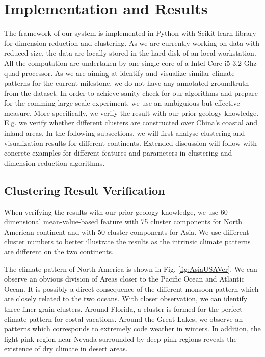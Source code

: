\section{Implementation and Results}
The framework of our system is implemented in Python with Scikit-learn library for dimension reduction and clustering.
As we are currently working on data with reduced size, the data are locally stored in the hard disk of an local workstation.
All the computation are undertaken by one single core of a Intel Core i5 3.2 Ghz quad processor.
As we are aiming at identify and visualize similar climate patterns for the current milestone, we do not have any annotated groundtruth from the dataset.
In order to achieve sanity check for our algorithms and prepare for the comming large-scale experiment, we use an ambiguious but effective measure.
More specifically, we verify the result with our prior geology knowledge. E.g. we verify whether different clusters are constructed over China's coastal and inland areas.
In the following subsections, we will first analyse clustering and visualization results for different continents.
Extended discussion will follow with concrete examples for different features and parameters in clustering and dimension reduction algorithms.

\subsection{Clustering Result Verification}

When verifying the results with our prior geology knowledge, we use 60 dimensional mean-value-based feature with 75 cluster components for North American continent and with 50 cluster components for Asia. We use different cluster numbers to better illustrate the results as the intrinsic climate patterns are different on the two continents.

The climate pattern of North America is shown in Fig. \ref{fig:AsiaUSAVer}. We can observe an obvious division of Areas closer to the Pacific Ocean and Atlantic Ocean. It is possibly a direct consequence of the different monsoon pattern which are closely related to the two oceans. With closer observation, we can identify three finer-grain clusters. Around Florida, a cluster is formed for the perfect climate pattern for costal vacations. Around the Great Lakes, we observe an patterns which corresponds to extremely code weather in winters. In addition, the light pink region near Nevada surrounded by deep pink regions reveals the existence of dry climate in desert areas.

